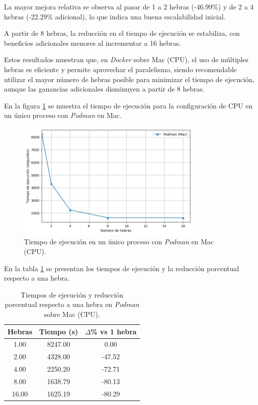 La mayor mejora relativa se observa al pasar de 1 a 2 hebras (-46.99\%) y de 2 a 4 hebras (-22.29\% adicional), lo que indica una buena escalabilidad inicial.

A partir de 8 hebras, la reducción en el tiempo de ejecución se estabiliza, con beneficios adicionales menores al incrementar a 16 hebras.

Estos resultados muestran que, en \textit{Docker} sobre Mac (CPU), el uso de múltiples hebras es eficiente y permite aprovechar el paralelismo, siendo recomendable utilizar el mayor número de hebras posible para minimizar el tiempo de ejecución, aunque las ganancias adicionales disminuyen a partir de 8 hebras.

En la figura \ref{fig:single-node_mac_podman_time} se muestra el tiempo de ejecución para la configuración de CPU en un único proceso con \textit{Podman} en Mac.

\begin{figure}[H]
    \centering
    \includegraphics[width=0.8\textwidth]{imagenes/cap5/single-node_mac_podman_time.png}
    \caption{Tiempo de ejecución en un único proceso con \textit{Podman} en Mac (CPU).}
    \label{fig:single-node_mac_podman_time}
\end{figure}

En la tabla \ref{tab:single-node_mac_podman_time} se presentan los tiempos de ejecución y la reducción porcentual respecto a una hebra.

\begin{table}[ht]
    \centering
    \begin{tabular}{|c|c|c|}
        \hline
        \textbf{Hebras} & \textbf{Tiempo (s)} & \textbf{$\Delta$\% vs 1 hebra} \\
        \hline
        1.00            & 8247.00             & 0.00                           \\
        2.00            & 4328.00             & -47.52                         \\
        4.00            & 2250.20             & -72.71                         \\
        8.00            & 1638.79             & -80.13                         \\
        16.00           & 1625.19             & -80.29                         \\
        \hline
    \end{tabular}
    \caption{Tiempos de ejecución y reducción porcentual respecto a una hebra en \textit{Podman} sobre Mac (CPU).}
    \label{tab:single-node_mac_podman_time}
\end{table}

